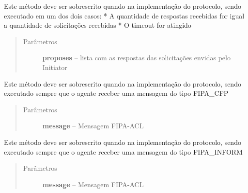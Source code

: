 \documentclass[letterpaper,10pt,brazil]{sphinxmanual}
\begin{document}
\begin{fulllineitems}
\begin{fulllineitems}
\begin{quote}
\begin{description}
\end{description}\end{quote}

\end{fulllineitems}


\begin{fulllineitems}
\label{api:pade.behaviours.protocols.FipaContractNetProtocol.handle_all_proposes}
Este método deve ser sobrescrito quando na implementação
do protocolo, sendo executado em um dos dois casos:
* A quantidade de respostas recebidas for igual a quantidade
de solicitações recebidas
* O timeout for atingido
\begin{quote}\begin{description}
\item[{Parâmetros}] \leavevmode
\textbf{proposes} -- lista com as respostas das solicitações envidas
pelo Initiator

\end{description}\end{quote}

\end{fulllineitems}


\begin{fulllineitems}
\label{api:pade.behaviours.protocols.FipaContractNetProtocol.handle_cfp}
Este método deve ser sobrescrito quando na implementação
do protocolo, sendo executado sempre que o agente receber
uma mensagem do tipo FIPA\_CFP
\begin{quote}\begin{description}
\item[{Parâmetros}] \leavevmode
\textbf{message} -- Mensagem FIPA-ACL

\end{description}\end{quote}

\end{fulllineitems}


\begin{fulllineitems}
\label{api:pade.behaviours.protocols.FipaContractNetProtocol.handle_inform}
Este método deve ser sobrescrito quando na implementação
do protocolo, sendo executado sempre que o agente receber
uma mensagem do tipo FIPA\_INFORM
\begin{quote}\begin{description}
\item[{Parâmetros}] \leavevmode
\textbf{message} -- Mensagem FIPA-ACL


\end{description}
\end{quote}
\end{fulllineitems}
\end{fulllineitems}
\end{document}
